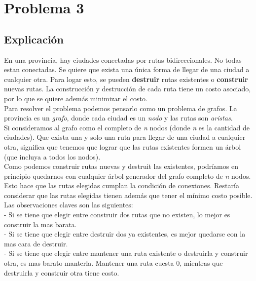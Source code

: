 
\section{Problema 3}

\subsection{Explicación}

En una provincia, hay ciudades conectadas por rutas bidireccionales. No todas estan conectadas. Se quiere que exista una única forma de llegar de una ciudad a cualquier otra. Para logar esto, se pueden \textbf{destruir} rutas existentes o \textbf{construir} nuevas rutas. La construcción y destrucción de cada ruta tiene un costo asociado, por lo que se quiere además minimizar el costo. \\

Para resolver el problema podemos pensarlo como un problema de grafos. La provincia es un \textit{grafo}, donde cada ciudad es un \textit{nodo} y las rutas son \textit{aristas}.  \\

Si consideramos al grafo como el completo de \textit{n} nodos (donde \textit{n} es la cantidad de ciudades). Que exista una y solo una ruta para llegar de una ciudad a cualquier otra, significa que tenemos que lograr que las rutas existentes formen un árbol (que incluya a todos los nodos).  \\

Como podemos construir rutas nuevas y destruit las existentes, podríamos en principio quedarnos con cualquier árbol generador del grafo completo de \textit{n} nodos. Esto hace que las rutas elegidas cumplan la condición de conexiones. Restaría considerar que las rutas elegidas tienen además que tener el mínimo costo posible. \\

Las observaciones claves son las siguientes: \\
- Si se tiene que elegir entre construir dos rutas que no existen, lo mejor es construir la mas barata. \\
- Si se tiene que elegir entre destruir dos ya existentes, es mejor quedarse con la mas cara de destruir. \\
- Si se tiene que elegir entre mantener una ruta existente o destruirla y construir otra, es mas barato manterla. Mantener una ruta cuesta 0, mientras que destruirla y construir otra tiene costo. \\

